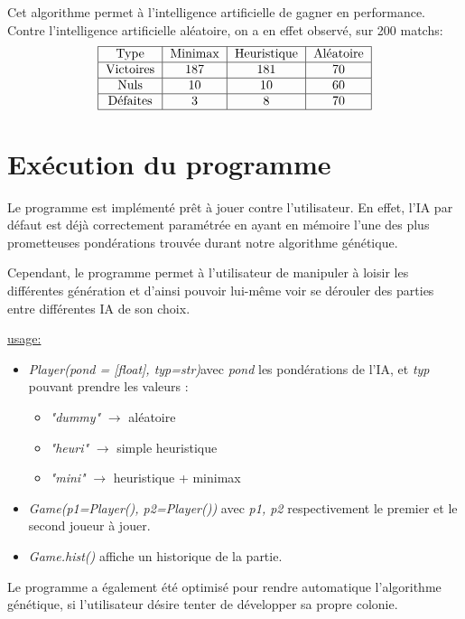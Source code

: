 \documentclass[10pt]{article}
\begin{document}
\begin{enumerate}
\begin{itemize}
Cet algorithme permet à l'intelligence artificielle de gagner en performance. \\
Contre l'intelligence artificielle aléatoire, on a en effet observé, sur 200 matchs: 
$$
\begin{tabular}{ |c|c|c|c| }
\hline
Type & Minimax & Heuristique & Aléatoire\\
\hline
Victoires & 187 & 181 & 70 \\
\hline
Nuls & 10 & 10 & 60 \\
\hline
 Défaites & 3 & 8 & 70 \\
 \hline
\end{tabular}
$$

\paragraph{}

\section{Exécution du programme}
Le programme est implémenté prêt à jouer contre l'utilisateur. En effet, l'IA par défaut est déjà correctement paramétrée en ayant en mémoire l'une des plus prometteuses pondérations trouvée durant notre algorithme génétique.
\par Cependant, le programme permet à l'utilisateur de manipuler à loisir les différentes génération et d'ainsi pouvoir lui-même voir se dérouler des parties entre différentes IA de son choix.
\par \underline{usage:}
\begin{itemize}
\item \textit{Player(pond = [float], typ=str)}\qquad avec \emph{pond} les pondérations de l'IA, et \emph{typ} pouvant prendre les valeurs :
\begin{itemize}\item \emph{"dummy"} $\rightarrow$ aléatoire
\item \emph{"heuri"} $\rightarrow$ simple heuristique
\item \emph{"mini"} $\rightarrow$ heuristique + minimax
\end{itemize}
\item \textit{Game(p1=Player(), p2=Player())} \qquad avec \emph{p1, p2} respectivement le premier et le second joueur à jouer.
\item \textit{Game.hist()} \qquad affiche un historique de la partie.
\end{itemize}
Le programme a également été optimisé pour rendre automatique l'algorithme génétique, si l'utilisateur désire tenter de développer sa propre colonie.


\end{itemize}
\end{enumerate}
\end{document}
